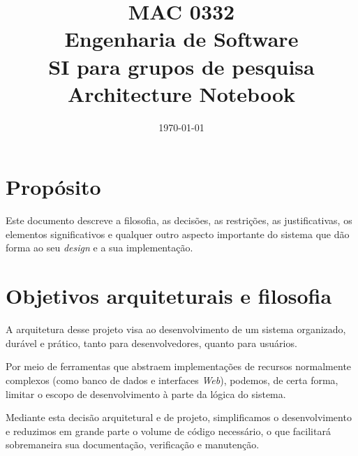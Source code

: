 \documentclass[11pt, a4paper]{article}
\title{MAC 0332\\
	Engenharia de Software\\
	SI para grupos de pesquisa\\
	Architecture Notebook}
\date{\today}
\begin{document}
	\maketitle
	\newpage
	
	\section{Propósito}
        Este documento descreve a filosofia, as decisões, as restrições, as
        justificativas, os elementos significativos e qualquer outro aspecto
        importante do sistema que dão forma ao seu \emph{design} e a sua implementação.

    \section{Objetivos arquiteturais e filosofia}
        A arquitetura desse projeto visa ao desenvolvimento de um sistema
        organizado, durável e prático, tanto para desenvolvedores, quanto para
        usuários.

        Por meio de ferramentas que abstraem implementações de recursos
        normalmente complexos (como banco de dados e interfaces \emph{Web}), podemos,
        de certa forma, limitar o escopo de desenvolvimento à parte da lógica do
        sistema.

        Mediante esta decisão arquitetural e de projeto, simplificamos o desenvolvimento e reduzimos em grande parte o volume de código necessário, o que facilitará sobremaneira sua documentação, verificação e manutenção.
\end{document}
